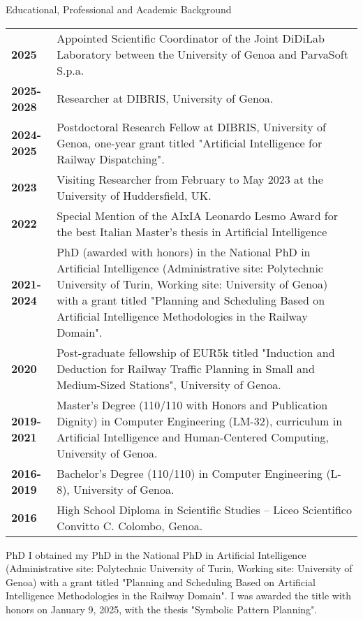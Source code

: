 \documentclass{resume} %
\begin{document}

\begin{rSection}{Educational, Professional and Academic Background}

\begin{tabularx}{0.95\textwidth} {lp{14cm}}
 \textbf{2025} & Appointed Scientific Coordinator of the Joint DiDiLab Laboratory between the University of Genoa and ParvaSoft S.p.a.  \\
 \textbf{2025-2028} & Researcher at DIBRIS, University of Genoa.  \\
 \textbf{2024-2025} & Postdoctoral Research Fellow at DIBRIS, University of Genoa, one-year grant titled "Artificial Intelligence for Railway Dispatching".  \\
 \textbf{2023}  & Visiting Researcher from February to May 2023 at the University of Huddersfield, UK.\\
  \textbf{2022}  & Special Mention of the AIxIA Leonardo Lesmo Award for the best Italian Master's thesis in Artificial Intelligence\\
 \textbf{2021-2024}  & PhD (awarded with honors) in the National PhD in Artificial Intelligence (Administrative site: Polytechnic University of Turin, Working site: University of Genoa) with a grant titled "Planning and Scheduling Based on Artificial Intelligence Methodologies in the Railway Domain".\\
 \textbf{2020} & Post-graduate fellowship of EUR5k titled "Induction and Deduction for Railway Traffic Planning in Small and Medium-Sized Stations", University of Genoa. \\
 \textbf{2019-2021}  & Master’s Degree (110/110 with Honors and Publication Dignity) in Computer Engineering (LM-32), curriculum in Artificial Intelligence and Human-Centered Computing, University of Genoa.  \\
 \textbf{2016-2019}  & Bachelor’s Degree (110/110) in Computer Engineering (L-8), University of Genoa. \\
 \textbf{2016}  & High School Diploma in Scientific Studies – Liceo Scientifico Convitto C. Colombo, Genoa. 
\end{tabularx}
\end{rSection}
\begin{rSection}{PhD}
	I obtained my PhD in the National PhD in Artificial Intelligence (Administrative site: Polytechnic University of Turin, Working site: University of Genoa) with a grant titled "Planning and Scheduling Based on Artificial Intelligence Methodologies in the Railway Domain". I was awarded the title with honors on January 9, 2025, with the thesis "Symbolic Pattern Planning".
\end{rSection}
\end{document}
